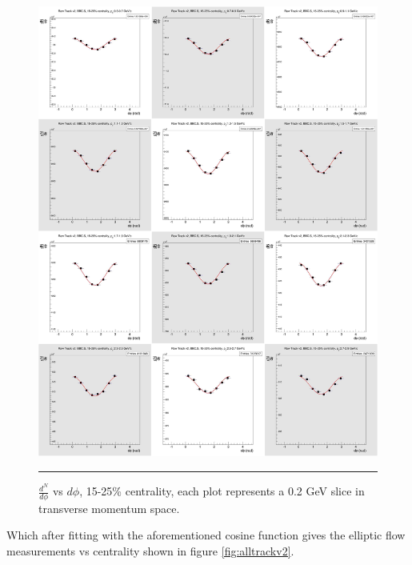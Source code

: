 \begin{figure}[htbp!]
  \centering
    \includegraphics[width=1\textwidth]{chargedtrackv2/htrkdphi2bbcs_3.jpg}
    \rule{35em}{0.5pt}
  \caption[$\frac{dN}{d\phi}$ vs $d\phi$, 15-25\% centrality.]{$\frac{d^N}{d\phi}$ vs $d\phi$, 15-25\% centrality, each plot represents a 0.2 GeV slice in transverse momentum space.}
  \label{fig:Ndphicent3}
\end{figure}

Which after fitting with the aforementioned cosine function gives the elliptic flow measurements vs centrality shown in figure \ref{fig:alltrackv2}.

